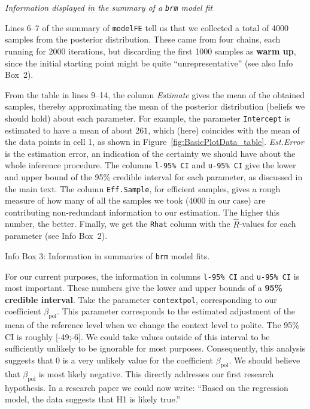 \documentclass[nobib]{tufte-handout}
\begin{document}
\begin{InfoBox}[t]
\centering
\colorbox{mygray}{\centering
  \begin{minipage}{1.0\textwidth}

    \emph{Information displayed in the summary of a \texttt{brm} model fit}
    \medskip

    Lines 6--7 of the summary of \texttt{modelFE} tell us that we collected a total of 4000 samples from the posterior distribution. These came from four chains, each running for 2000 iterations, but discarding the first 1000 samples as \textbf{warm up}, since the initial starting point might be quite ``unrepresentative'' (see also Info Box~2).
    
    From the table in lines 9--14, the column \emph{Estimate} gives the mean of the obtained
    samples, thereby approximating the mean of the posterior distribution (beliefs we should
    hold) about each parameter. For example, the parameter \texttt{Intercept} is estimated to
    have a mean of about $261$, which (here) coincides with the mean of the data points in cell
    1, as shown in Figure~\ref{fig:BasicPlotData_table}. \emph{Est.Error} is the estimation
    error, an indication of the certainty we should have about the whole inference procedure.
    The columns \texttt{l-95\% CI} and \texttt{u-95\% CI} give the lower and upper bound of the
    95\% credible interval for each parameter, as discussed in the main text. The column
    \texttt{Eff.Sample}, for efficient samples, gives a rough measure of how many of all the
    samples we took (4000 in our case) are contributing non-redundant information to our
    estimation. The higher this number, the better. Finally, we get the \texttt{Rhat} column with the $\hat{R}$-values for each parameter (see Info Box~2).
    
  \end{minipage} \par
  } \par
  \begin{center}
    Info Box 3: Information in summaries of \texttt{brm} model fits.
  \end{center}
\end{InfoBox}


For our current purposes, the information in  columns \texttt{l-95\% CI} and \texttt{u-95\% CI} is most important.
These numbers give the lower and upper bounds of a \textbf{95\% credible interval}.
Take the parameter \texttt{contextpol}, corresponding to our coefficient $\beta_{\text{pol}}$.
This parameter corresponds to the estimated adjustment of the mean of the reference level when we change the context level to polite.
The 95\% CI is roughly [-49;-6].
We could take values outside of this interval to be sufficiently unlikely to be ignorable for most purposes.
Consequently, this analysis suggests that 0 is a very unlikely value for the coefficient
$\beta_{\text{pol}}$.
We should believe that $\beta_{\text{pol}}$ is most likely negative.
This directly addresses our first research hypothesis.
In a research paper we could now write: ``Based on the regression model, the data suggests that H1 is likely true.''
\end{document}
